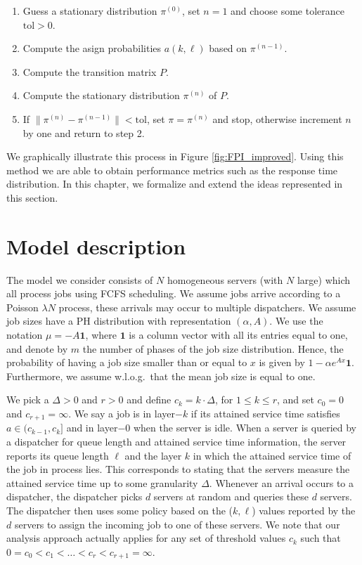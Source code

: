 \documentclass[12pt]{report}
\begin{document}
\begin{enumerate}
	\item Guess a stationary distribution $\pi^{(0)}$, set $n=1$ and choose some tolerance $\mbox{tol} > 0$.
	\item Compute the asign probabilities $a(k,\ell)$ based on $\pi^{(n-1)}$.
	\item Compute the transition matrix $P$.
	\item Compute the stationary distribution $\pi^{(n)}$ of $P$.
	\item If $\|\pi^{(n)} - \pi^{(n-1)}\| < \mbox{tol}$, set $\pi = \pi^{(n)}$ and stop, otherwise increment $n$ by one and return to step 2.
\end{enumerate}
We graphically illustrate this process in Figure \ref{fig:FPI_improved}. Using this method we are able to obtain performance metrics such as the response time distribution. In this chapter, we formalize and extend the ideas represented in this section.

\section{Model description}\label{sec:model}
The model we consider consists of $N$ homogeneous servers (with $N$ large) which all process jobs using FCFS scheduling. We assume jobs arrive according to a Poisson $\lambda N$ process, these arrivals may occur to multiple dispatchers. We assume job sizes have a PH 
distribution with representation $(\alpha, A)$. We use the notation $\mu = -A \textbf{1}$,
where $\textbf{1}$ is a column vector with all its entries equal to one, and denote by $m$ the number of phases of the job size distribution. Hence, the probability
of having a job size smaller than or equal to $x$ is given by $1- \alpha e^{Ax} \textbf{1}$.
Furthermore, we assume w.l.o.g.~that the mean job size is equal to one. 


We pick a $\Delta>0$ and $r> 0$ and define $c_k=k\cdot \Delta$, for $1 \leq k\leq r$, and set
$c_0 = 0$ and $c_{r+1} = \infty$. We say a job is in layer$-k$ if its attained service time satisfies $a \in (c_{k-1}, c_{k}]$
and in layer$-0$ when the server is idle. 
When a server is queried by a dispatcher for queue length and attained service time information,
the server reports its queue length $\ell$ and the layer $k$ in which the attained service time of the job in process lies. This corresponds to stating that the servers measure the attained service time up to some granularity $\Delta$. Whenever an arrival occurs to a dispatcher, the dispatcher picks $d$ servers at random and queries these $d$ servers. The dispatcher then uses some policy based on the ($k,\ell$) values reported by the $d$ servers to assign the incoming job to one of these servers. We note that our analysis approach actually applies for any
set of threshold values $c_k$ such that $0=c_0 < c_1 < \dots < c_r < c_{r+1} = \infty$.
\end{document}

